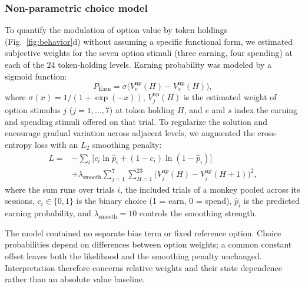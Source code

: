 \documentclass[pdflatex,sn-mathphys-num]{sn-jnl}%
\begin{document}
\subsubsection{Non-parametric choice model}\label{sec:m_nonparam}
To quantify the modulation of option value by token holdings (Fig.~\ref{fig:behavior}d) without assuming a specific functional form, we estimated subjective weights for the seven option stimuli (three earning, four spending) at each of the 24 token-holding levels. Earning probability was modeled by a sigmoid function:
\begin{equation}
P_\mathrm{Earn} = \sigma\bigl(V_e^{\mathrm{np}}(H) - V_s^{\mathrm{np}}(H)\bigr),
\end{equation}
where $\sigma(x)=1/(1+\exp(-x))$, $V_j^{\mathrm{np}}(H)$ is the estimated weight of option stimulus $j$ ($j=1,\ldots,7$) at token holding $H$, and $e$ and $s$ index the earning and spending stimuli offered on that trial. To regularize the solution and encourage gradual variation across adjacent levels, we augmented the cross-entropy loss with an $L_2$ smoothing penalty:
\begin{equation}
\begin{split}
L = {}& -\sum_{i} \bigl[c_i \ln \hat{p}_i + (1 - c_i) \ln(1 - \hat{p}_i)\bigr] \\
& + \lambda_{\mathrm{smooth}} \sum_{j=1}^{7}\sum_{H=1}^{23} \bigl(V_j^{\mathrm{np}}(H) - V_j^{\mathrm{np}}(H+1)\bigr)^2,
\end{split}
\end{equation}
where the sum runs over trials $i$, the included trials of a monkey pooled across its sessions, $c_i \in \{0,1\}$ is the binary choice (1 = earn, 0 = spend), $\hat{p}_i$ is the predicted earning probability, and $\lambda_{\mathrm{smooth}} = 10$ controls the smoothing strength.

The model contained no separate bias term or fixed reference option. Choice probabilities depend on differences between option weights; a common constant offset leaves both the likelihood and the smoothing penalty unchanged. Interpretation therefore concerns relative weights and their state dependence rather than an absolute value baseline.
\end{document}
